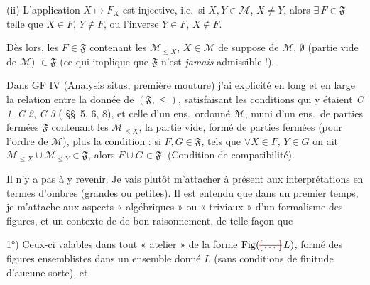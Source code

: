 \documentclass[11pt,a4paper]{article}
\begin{document}
(ii) L'application $X \mapsto F_X$ est injective, i.e.\ si $X, Y \in \mathcal{M}$, $X \neq Y$, alors $\exists\, F \in \mathfrak{F}$ telle que $X \in F$, $Y \notin F$, ou l'inverse $Y \in F$, $X \notin F$.

Dès lors, les $F \in \mathfrak{F}$ \struck{\ill{}}  contenant les $\mathcal{M}_{\leq X}$, $X \in \mathcal{M}$ \struck{\ill{}} \add{\ill{}}  de  \ill{} suppose de $\mathcal{M}$,  $\emptyset$ (partie vide de $\mathcal{M}$) $\in \mathfrak{F}$ (ce qui implique que $\mathfrak{F}$ n'est \emph{jamais} admissible !).

Dans GF IV (Analysis situs, première mouture) j'ai explicité en long et en large la relation entre la donnée de $(\mathfrak{F}, \leq)$, satisfaisant les conditions qui y étaient  \emph{C 1}, \emph{C 2}, \emph{C 3} ( §§~5, 6, 8), et celle d'un ens.\ ordonné $\mathcal{M}$, muni d'un ens.\ de parties fermées $\mathfrak{F}$  contenant les $\mathcal{M}_{\leq X}$, la partie vide, formé de parties fermées (pour l'ordre de $\mathcal{M}$), plus la condition : si $F, G \in \mathfrak{F}$, tels que $\forall X \in F$, $Y \in G$ on ait $\mathcal{M}_{\leq X} \cup \mathcal{M}_{\leq Y} \in \mathfrak{F}$, alors $F \cup G \in \mathfrak{F}$. (Condition de compatibilité).

Il n'y a pas à y revenir. Je vais plutôt m'attacher à présent aux interprétations en termes d'ombres (grandes ou petites). Il est entendu que dans un premier temps, je m'attache aux aspects « algébriques » ou « triviaux » d'un formalisme des figures, et un contexte de  de bon raisonnement, de telle façon que

1°) Ceux-ci \struck{\ill{}} valables dans tout « atelier » de la forme $\mathrm{Fig}(\text{\struck{\ill{}}}\, L)$, formé des figures ensemblistes dans un ensemble donné $L$ (sans conditions de finitude d'aucune sorte), et
\end{document}
